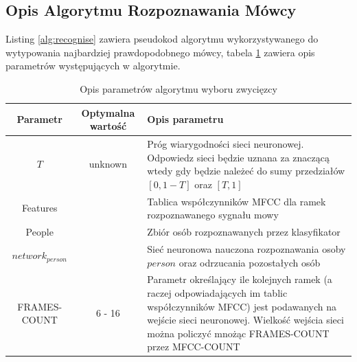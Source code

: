 \documentclass[a4paper]{article}
\begin{document}
	\clearpage
	\subsection{Opis Algorytmu Rozpoznawania Mówcy}
	
		Listing \ref{alg:recognise} zawiera pseudokod algorytmu wykorzystywanego 
		do wytypowania najbardziej prawdopodobnego mówcy, tabela \ref{tab:srparams}
		zawiera opis parametrów występujących w algorytmie.
		\begin{table}[h]
			\centering
			\begin{tabular}{|c|c|p{6cm}|}
				\hline
				Parametr & Optymalna wartość & Opis parametru \\
				\hline \hline
				$T$ & unknown & Próg wiarygodności sieci neuronowej. Odpowiedz sieci będzie
				uznana za znaczącą wtedy gdy będzie należeć do sumy przedziałów $[0, 1-T]$ oraz
				$[T, 1]$ \\
				\hline
				Features & & Tablica współczynników MFCC dla ramek rozpoznawanego sygnału mowy \\
				\hline
				People & & Zbiór osób rozpoznawanych przez klasyfikator \\
				\hline
				$network_{person}$ & & Sieć neuronowa nauczona rozpoznawania osoby $person$ oraz 
				odrzucania pozostałych osób \\
				\hline
				FRAMES-COUNT & 6 - 16 & Parametr określający ile kolejnych ramek 
				(a raczej odpowiadających im tablic
				współczynników MFCC) jest podawanych na wejście sieci neuronowej. Wielkość wejścia sieci
				można policzyć mnożąc FRAMES-COUNT przez MFCC-COUNT \\
				\hline
			\end{tabular}			
			\caption{Opis parametrów algorytmu wyboru zwycięzcy}
			\label{tab:srparams}
		\end{table}		
\end{document}
